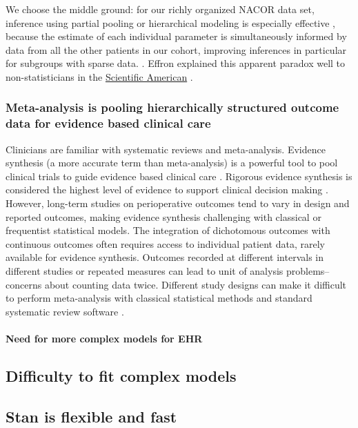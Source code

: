\documentclass[11pt,notitlepage]{article}
\begin{document}
We choose the middle ground: for our richly organized NACOR data set, inference using partial pooling or hierarchical modeling is especially effective , because the estimate of each individual parameter is simultaneously informed by data from all the other patients in our cohort, improving inferences in particular for subgroups with sparse data. \cite{Gelman2009}. Effron explained this apparent paradox well to non-statisticians in the \href{http://www.nature.com/scientificamerican/journal/v236/n5/pdf/scientificamerican0577-119.pdf}{Scientific American} \cite{Efron_1977,Efron_1977a}. 

\subsubsection*{Meta-analysis is pooling hierarchically structured outcome data for evidence based clinical care}

Clinicians are familiar with systematic reviews and meta-analysis\cite{Sackett1996}. Evidence synthesis (a more accurate term than meta-analysis) is a powerful tool to pool clinical trials to guide evidence based clinical care \cite{Ashby2000}. Rigorous evidence synthesis is considered the highest level of evidence to support clinical decision making \cite{Cook1997}. However, long-term studies on perioperative outcomes tend to vary in design and reported outcomes\cite{Andreae2013}, making evidence synthesis challenging with classical or frequentist statistical models\cite{Spiegelhalter2000}. The integration of dichotomous outcomes with continuous outcomes often requires access to individual patient data, rarely available for evidence synthesis. Outcomes recorded at different intervals in different studies or repeated measures can lead to unit of analysis problems--concerns about counting data twice. Different study designs can make it difficult to perform meta-analysis with classical statistical methods and standard systematic review software \cite{Deeks2011chapter}. 

\paragraph*{Need for more complex models for EHR}


\subsection*{Difficulty to fit complex models}

\subsection*{Stan is flexible and fast}
\end{document}
